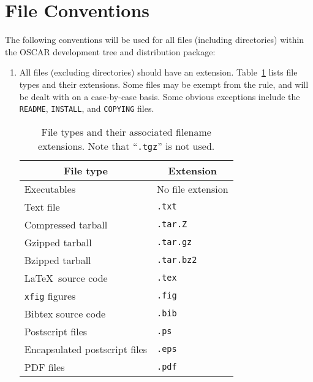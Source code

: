 %
%
%

\section{File Conventions}
\label{sec:file-conventions}

The following conventions will be used for all files (including
directories) within the OSCAR development tree and distribution
package:

\begin{enumerate}
  
\item All files (excluding directories) should have an extension.
  Table~\ref{tbl:files-exts} lists file types and their extensions.
  Some files may be exempt from the rule, and will be dealt with on a
  case-by-case basis.  Some obvious exceptions include the {\tt
    README}, {\tt INSTALL}, and {\tt COPYING} files.

  \begin{table}[tb]
    \begin{center}
      \begin{tabular}{|l|l|}
        \hline
        \multicolumn{1}{|c|}{{\bf File type}} & 
        \multicolumn{1}{c|}{{\bf Extension}} \\
        \hline
        Executables & No file extension \\
        Text file & {\tt .txt} \\
        \hline
        Compressed tarball & {\tt .tar.Z} \\
        Gzipped tarball & {\tt .tar.gz} \\
        Bzipped tarball & {\tt .tar.bz2} \\
        \hline
        \LaTeX\ source code & {\tt .tex} \\
        {\tt xfig} figures & {\tt .fig} \\
        Bibtex source code & {\tt .bib} \\
        Postscript files & {\tt .ps} \\
        Encapsulated postscript files & {\tt .eps} \\
        PDF files & {\tt .pdf} \\
        \hline
      \end{tabular}
      \caption[File types and their associated filename 
        extensions.]{File types and their associated filename
        extensions.  Note that ``{\tt .tgz}'' is not used.}
      \label{tbl:files-exts}
    \end{center}
  \end{table}
  

\end{enumerate}
